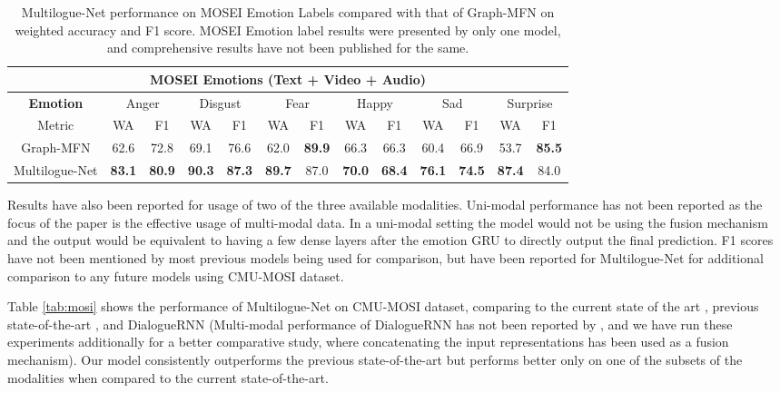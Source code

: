 \documentclass[11pt,a4paper]{article}
\begin{document}
\begin{table*}
\centering
\begin{tabular}{|c|c|c|c|c|c|c|c|c|c|c|c|c|}
\hline
\multicolumn{13}{|c|}{\textbf{MOSEI Emotions (Text + Video + Audio)}} \\
\hline
\textbf{Emotion} & \multicolumn{2}{|c|}{Anger} & \multicolumn{2}{|c|}{Disgust} & \multicolumn{2}{|c|}{Fear} & \multicolumn{2}{|c|}{Happy} & \multicolumn{2}{|c|}{Sad} & \multicolumn{2}{|c|}{Surprise} \\
\hline
Metric & WA & F1 & WA & F1 & WA & F1 & WA & F1 & WA & F1 & WA & F1 \\
\hline
Graph-MFN  & 62.6 & 72.8 & 69.1 & 76.6 & 62.0 & \textbf{89.9} & 66.3 & 66.3 & 60.4 & 66.9 & 53.7 & \textbf{85.5} \\
Multilogue-Net  & \textbf{83.1} & \textbf{80.9} & \textbf{90.3} & \textbf{87.3} & \textbf{89.7} & 87.0 & \textbf{70.0} & \textbf{68.4} & \textbf{76.1} & \textbf{74.5} & \textbf{87.4} & 84.0 \\
\hline

\end{tabular}
\caption{\label{tab:mosei2}
Multilogue-Net performance on MOSEI Emotion Labels compared with that of Graph-MFN on weighted accuracy and F1 score. MOSEI Emotion label results were presented by only one model, and comprehensive results have not been published for the same.
}
\end{table*}
Results have also been reported for usage of two of the three available modalities. Uni-modal performance has not been reported as the focus of the paper is the effective usage of multi-modal data. In a uni-modal setting the model would not be using the fusion mechanism and the output would be equivalent to having a few dense layers after the emotion GRU to directly output the final prediction. F1 scores have not been mentioned by most previous models being used for comparison, but have been reported for Multilogue-Net for additional comparison to any future models using CMU-MOSI dataset.

Table \ref{tab:mosi} shows the performance of Multilogue-Net on CMU-MOSI dataset, comparing to the current state of the art \cite{ghosal}, previous state-of-the-art \cite{poria2}, and DialogueRNN \cite{dialoguernn} (Multi-modal performance of DialogueRNN has not been reported by \citet{dialoguernn}, and we have run these experiments additionally for a better comparative study, where concatenating the input representations has been used as a fusion mechanism). Our model consistently outperforms the previous state-of-the-art but performs better only on one of the subsets of the modalities when compared to the current state-of-the-art. 
\end{document}
